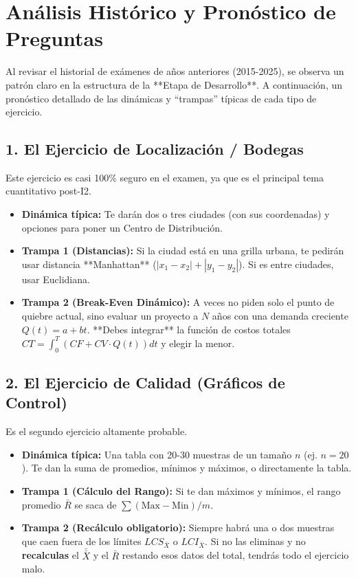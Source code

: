 \section{Análisis Histórico y Pronóstico de Preguntas}

Al revisar el historial de exámenes de años anteriores (2015-2025), se observa un patrón claro en la estructura de la **Etapa de Desarrollo**. A continuación, un pronóstico detallado de las dinámicas y ``trampas'' típicas de cada tipo de ejercicio.

\subsection{1. El Ejercicio de Localización / Bodegas}
Este ejercicio es casi 100\% seguro en el examen, ya que es el principal tema cuantitativo post-I2.
\begin{itemize}
    \item \textbf{Dinámica típica:} Te darán dos o tres ciudades (con sus coordenadas) y opciones para poner un Centro de Distribución. 
    \item \textbf{Trampa 1 (Distancias):} Si la ciudad está en una grilla urbana, te pedirán usar distancia **Manhattan** ($|x_1-x_2| + |y_1-y_2|$). Si es entre ciudades, usar Euclidiana.
    \item \textbf{Trampa 2 (Break-Even Dinámico):} A veces no piden solo el punto de quiebre actual, sino evaluar un proyecto a $N$ años con una demanda creciente $Q(t) = a + bt$. **Debes integrar** la función de costos totales $CT = \int_0^T (CF + CV \cdot Q(t)) dt$ y elegir la menor.
\end{itemize}

\subsection{2. El Ejercicio de Calidad (Gráficos de Control)}
Es el segundo ejercicio altamente probable.
\begin{itemize}
    \item \textbf{Dinámica típica:} Una tabla con 20-30 muestras de un tamaño $n$ (ej. $n=20$). Te dan la suma de promedios, mínimos y máximos, o directamente la tabla.
    \item \textbf{Trampa 1 (Cálculo del Rango):} Si te dan máximos y mínimos, el rango promedio $\bar{R}$ se saca de $\sum (\text{Max} - \text{Min}) / m$.
    \item \textbf{Trampa 2 (Recálculo obligatorio):} Siempre habrá una o dos muestras que caen fuera de los límites $LCS_{\bar{X}}$ o $LCI_{\bar{X}}$. Si no las eliminas y no \textbf{recalculas} el $\bar{\bar{X}}$ y el $\bar{R}$ restando esos datos del total, tendrás todo el ejercicio malo.
\end{itemize}

